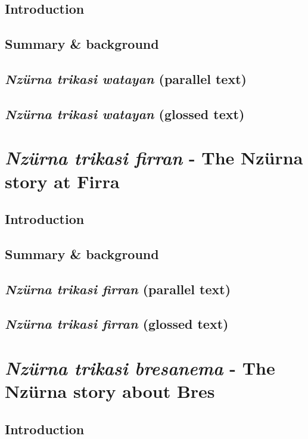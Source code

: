 \documentclass[output=book,
		  ]{langscibook}
\begin{document}
\section{Introduction}
    
\section{Summary \& background}
    
\section{\textit{Nzürna trikasi watayan} (parallel text)}
    
    \newpage
\section{\textit{Nzürna trikasi watayan} (glossed text)}
    

\chapter{\textit{Nzürna trikasi firran} - The Nzürna story at Firra}\label{text:nzurna-maraga}
\section{Introduction}
    
\section{Summary \& background}
    
\section{\textit{Nzürna trikasi firran} (parallel text)}
    
    \newpage
\section{\textit{Nzürna trikasi firran} (glossed text)}
    

\chapter{\textit{Nzürna trikasi bresanema} - The Nzürna story about Bres}\label{text:nzurna-kurai}
\section{Introduction}
    
\end{document}

